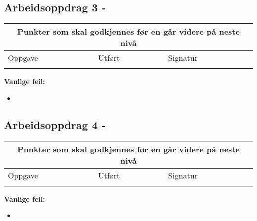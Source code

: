 \subsection*{Arbeidsoppdrag 3 - }

\begin{center}
\begin{tabular}{ | m{8cm} | m{1cm}| m{2cm} | } 
\hline
\multicolumn{3}{|c|}{Punkter som skal godkjennes før en går videre på neste nivå} \\
	\hline
	Oppgave	& Utført & Signatur \\ 
	\hline
& & \\ 
	\hline
\end{tabular}
\end{center}
\textbf{Vanlige feil:}
\begin{itemize}[noitemsep]
	\item 
\end{itemize}
\newpage

\subsection*{Arbeidsoppdrag 4 - }
\begin{center}
\begin{tabular}{ | m{8cm} | m{1cm}| m{2cm} | } 
\hline
\multicolumn{3}{|c|}{Punkter som skal godkjennes før en går videre på neste nivå} \\
	\hline
	Oppgave	& Utført & Signatur \\ 
	\hline
& & \\ 
	\hline
\end{tabular}
\end{center}
\textbf{Vanlige feil:}
\begin{itemize}[noitemsep]
	\item 
\end{itemize}
\newpage





